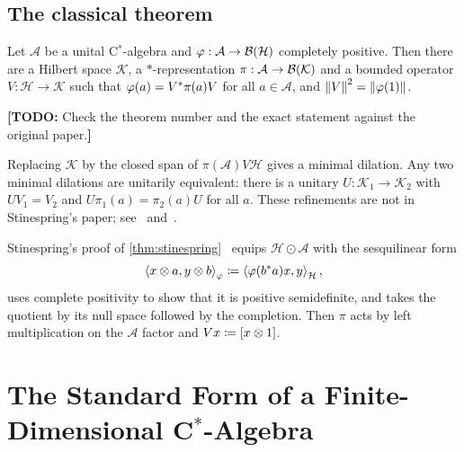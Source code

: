 \documentclass[12pt]{article}
\newcommand{\todo}[1]{\textcolor{\mysubcolor}{\small\textbf{[TODO:} #1\textbf{]}}}
\newcommand{\alg}{\mathcal{A}}             %
\newcommand{\hilb}{\mathcal{H}}            %
\newcommand{\dil}{\mathcal{K}}             %
\newcommand{\bdd}[1]{\mathcal{B}\br{#1}}   %
\newcommand{\algtensor}{\odot}             %
\newcommand{\ip}[2]{\left\langle #1 , #2 \right\rangle}
\newcommand{\ipphi}[2]{\left\langle #1 , #2 \right\rangle_{\varphi}}
\begin{document}
\subsection{The classical theorem}
\label{sec:classical}

\begin{theorem}
\label{thm:stinespring}
Let \(\alg\) be a unital C\(^*\)-algebra and \(\varphi : \alg \to \bdd{\hilb}\)
completely positive. Then there are a Hilbert space \(\dil\), a
\(*\)-representation \(\pi : \alg \to \bdd{\dil}\) and a bounded operator
\(V : \hilb \to \dil\) such that \(\varphi(a) = V^* \pi(a) V\) for all
\(a \in \alg\), and \(\left\| V \right\|^2 = \left\| \varphi(1) \right\|\).
\end{theorem}
\todo{Check the theorem number and the exact statement against the original
paper.}

\begin{remark}
\label{rem:uniqueness}
Replacing \(\dil\) by the closed span of \(\pi(\alg)V\hilb\) gives a minimal
dilation. Any two minimal dilations are unitarily equivalent: there is a unitary
\(U : \dil_1 \to \dil_2\) with \(U V_1 = V_2\) and
\(U \pi_1(a) = \pi_2(a) U\) for all \(a\). These refinements are not in
Stinespring's paper; see~\cite{Arveson1969} and~\cite[Chapter~4]{Paulsen2002}.
\end{remark}

\begin{remark}
\label{rem:standard}
Stinespring's proof of \cref{thm:stinespring}~\cite{Stinespring1955} equips
\(\hilb \algtensor \alg\) with the sesquilinear form
\begin{equation}
\label{eq:phi-form}
  \ipphi{x \tensor a}{y \tensor b} \eqdef \ip{\varphi(b^\adjoint a) x}{y}_{\hilb},
\end{equation}
uses complete positivity to show that it is positive semidefinite, and takes the
quotient by its null space followed by the completion. Then \(\pi\) acts by left
multiplication on the \(\alg\) factor and \(V x \coloneqq [x \otimes 1]\).
\end{remark}

\section{The Standard Form of a Finite-Dimensional C\texorpdfstring{\(^*\)}{*}-Algebra}
\label{sec:standard-form}
\end{document}

